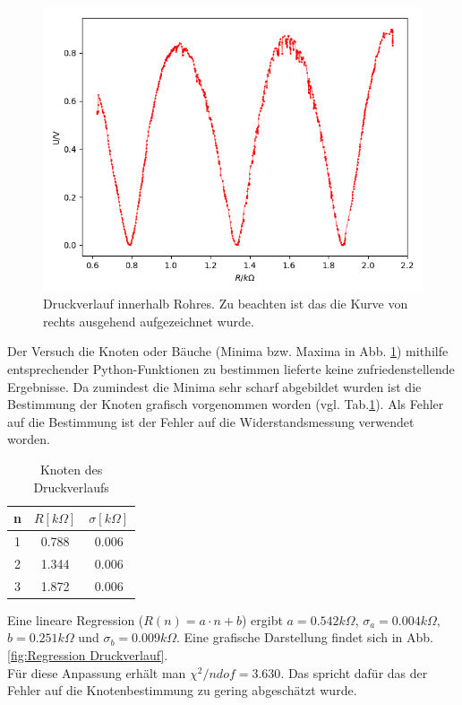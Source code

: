 \documentclass[12pt,a4paper]{article}
\begin{document}
\begin{figure}
	\includegraphics[width=\linewidth]{druckverlauf}
	\caption{Druckverlauf innerhalb Rohres. Zu beachten ist das die Kurve von rechts ausgehend aufgezeichnet wurde.}
	\label{Druckverlauf}
\end{figure}

Der Versuch die Knoten oder Bäuche (Minima bzw. Maxima in Abb. \ref{Druckverlauf}) mithilfe entsprechender Python-Funktionen zu bestimmen lieferte keine zufriedenstellende Ergebnisse.
Da zumindest die Minima sehr scharf abgebildet wurden ist die Bestimmung der Knoten grafisch vorgenommen worden (vgl. Tab.\ref{tab:Druckknoten}). Als Fehler auf die Bestimmung ist der Fehler auf die Widerstandsmessung verwendet worden.

\begin{table}
	\begin{center}
		\begin{tabular}{|c|c|c|}
			\hline 
			n & $R[k\Omega]$ & $\sigma[k\Omega]$ \\ 
			\hline 
			1 & 0.788  & 0.006 \\ 
			\hline 
			2 & 1.344  & 0.006 \\ 
			\hline 
			3 & 1.872 & 0.006 \\ 
			\hline 
		\end{tabular}
		\caption[Druckknoten]{Knoten des Druckverlaufs}
		\label{tab:Druckknoten}
	\end{center}
\end{table}

Eine lineare Regression ($R(n)=a \cdot n+b$) ergibt $a=0.542k\Omega$, $\sigma_{a}=0.004k\Omega$, $b=0.251k\Omega$ und $\sigma_b=0.009k\Omega$. Eine grafische Darstellung findet sich in Abb. \ref{fig:Regression Druckverlauf}.\\
Für diese Anpassung erhält man $\chi^2/ndof=3.630$. Das spricht dafür das der Fehler auf die Knotenbestimmung zu gering abgeschätzt wurde.
\end{document}
